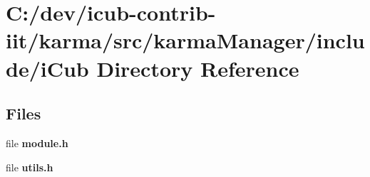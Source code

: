 \section{C\+:/dev/icub-\/contrib-\/iit/karma/src/karma\+Manager/include/i\+Cub Directory Reference}
\label{dir_0485f0c3e5fc27f1b21a0a793d715761}
\subsection*{Files}
\begin{DoxyCompactItemize}
\item 
file {\bfseries module.\+h}
\item 
file {\bfseries utils.\+h}
\end{DoxyCompactItemize}
